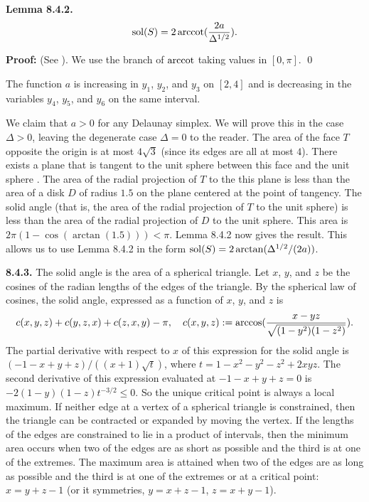 {\bf Lemma 8.4.2.}  
$$\operatorname{sol}(S) = {2} \operatorname{arccot}({2 a\over \Delta^{1/2}}).
$$


{\bf Proof:} (See \cite{H2, p.64}).
We use the branch of $\operatorname{arccot}$ taking values in $[0,\pi]$.
\qed

The function $a$ is increasing in $y_1$, $y_2$, and $y_3$ on $[2,4]$
and is decreasing in the variables $y_4$, $y_5$, and $y_6$ on the same interval.

We claim that $a>0$ for any Delaunay simplex.  We will prove this
in the case $\Delta>0$, leaving the degenerate
case $\Delta=0$ to the reader. The area of the face $T$ opposite
the origin is at most $4\sqrt{3}$ (since its edges are all at most
$4$).  There exists a plane that is tangent to the
unit sphere between this face and the unit sphere
\cite{H1,2.1}.  The area
of the radial projection of $T$ to the this plane is less than
the area of a disk $D$ of radius $1.5$ on the plane centered
at the point of tangency.  The solid angle (that is, the area
of the radial projection of $T$ to the unit sphere) is less
than the area of the radial projection of $D$ to the unit sphere.
This area is $2\pi(1-\cos(\arctan(1.5)))<\pi$.  Lemma 8.4.2
now gives the result.  This allows us to use Lemma 8.4.2
in the form $\operatorname{sol}(S) = 2\arctan(\Delta^{1/2}/(2a))$.


{\bf 8.4.3.}  The solid angle is the
area of a spherical triangle.  Let $x$, $y$, and $z$
be the cosines of the radian lengths of the edges of the
triangle. By the spherical law of cosines, the solid angle,
expressed as a function of $x$, $y$, and $z$ is
$$c(x,y,z)+c(y,z,x)+c(z,x,y)-\pi,\quad 
c(x,y,z):=\arccos({x-yz\over \sqrt{(1-y^2)(1-z^2)}}).$$
The partial derivative with respect to $x$ of this expression 
for the solid angle 
is $(-1-x+y+z)/((x+1)\sqrt{t})$, where $t=1-x^2-y^2-z^2+2xyz$.
The second derivative of this expression evaluated at $-1-x+y+z=0$
is $-2(1-y)(1-z)t^{-3/2}\le 0$.  So the 
unique critical point is always a local maximum.
If neither edge at a vertex of a spherical triangle is constrained,
then the triangle can be contracted or expanded by moving the vertex.
  If the lengths of the edges 
are constrained to lie in a product of intervals, then the
minimum area occurs when two of the edges are as short as possible
and the third is at one of the extremes.  The maximum area
is attained when two of the edges are as long as possible and
the third is at one of the extremes or at a critical point:
$x=y+z-1$ (or it symmetries, $y=x+z-1$, $z=x+y-1$).


\bigskip
{}
\bigskip



